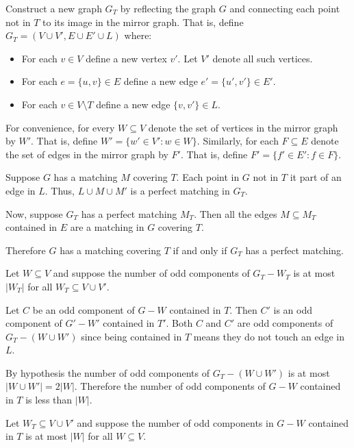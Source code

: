 \documentclass[10pt]{article}
\begin{document}
\begin{solution}

Construct a new graph \( G_T \) by reflecting the graph \( G \) and connecting each point not in \( T \) to its image in the mirror graph. That is, define \( G_T = (V\cup V', E\cup E'\cup L) \) where:
\begin{itemize}[nolistsep]
    \item For each \( v\in V \) define a new vertex \( v' \). Let \( V' \) denote all such vertices.
    \item For each \( e=\{u,v\}\in E \) define a new edge \( e' = \{u',v'\} \in E' \).
    \item For each \( v\in V\setminus T \) define a new edge \( \{v,v'\} \in L \).
\end{itemize}

For convenience, for every \( W\subseteq V \) denote the set of vertices in the mirror graph by \( W' \). That is, define \( W' = \{ w'\in V' : w\in W \} \). Similarly, for each \( F \subseteq E \) denote the set of edges in the mirror graph by \( F' \). That is, define \( F' = \{f'\in E': f\in F \} \).

Suppose \( G \) has a matching \( M \) covering \( T \). Each point in \( G \) not in \( T \) it part of an edge in \( L \). Thus, \( L\cup M \cup M' \) is a perfect matching in \( G_T \).

Now, suppose \( G_T \) has a perfect matching \( M_T \). Then all the edges \( M\subseteq M_T \) contained in \( E \) are a matching in \( G \) covering \( T \).

Therefore \( G \) has a matching covering \( T \) if and only if \( G_T \) has a perfect matching.


Let \( W\subseteq V \) and suppose the number of odd components of \( G_T-W_T \) is at most \( |W_T| \) for all \( W_T\subseteq V\cup V' \).

Let \( C \) be an odd component of \( G-W \) contained in \( T \). Then \( C' \) is an odd component of \( G'-W' \) contained in \( T' \). Both \( C \) and \( C' \) are odd components of \( G_T - (W\cup W') \) since being contained in \( T \) means they do not touch an edge in \( L \).

By hypothesis the number of odd components of \( G_T - (W\cup W') \) is at most \( |W\cup W'| = 2|W| \). 
Therefore the number of odd components of \( G - W \) contained in \( T \) is less than \( |W| \).

Let \( W_T\subseteq V\cup V' \) and suppose the number of odd components in \( G - W \) contained in \( T \) is at most \( |W| \) for all \( W\subseteq V \).


\end{solution}
\end{document}
